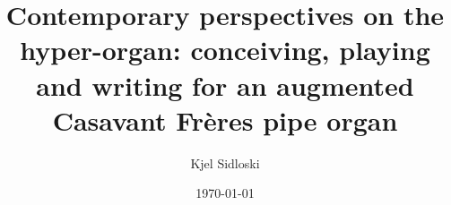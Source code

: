 \documentclass[12pt,twoside,maitrise]{dms_ks}
\theoremstyle{definition}
\begin{document}
\entetedynamique




\title{Contemporary perspectives on the hyper-organ: conceiving, playing and writing for an augmented Casavant Frères pipe organ}

\author{Kjel Sidloski}



\date{\today} %

\sujet{}









\end{document}
